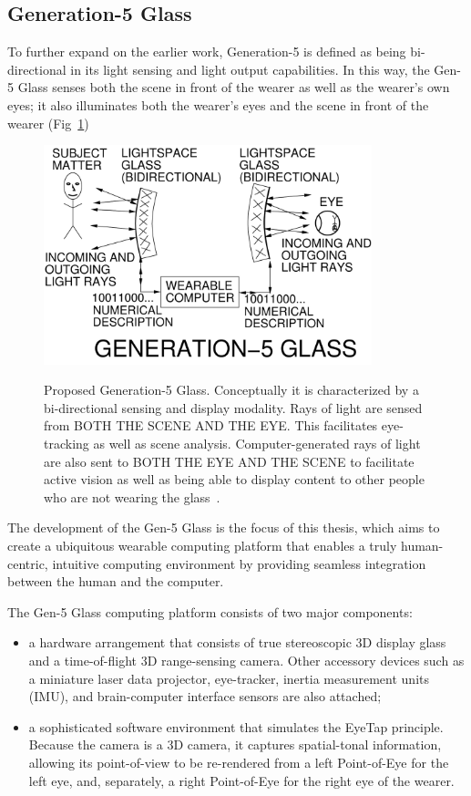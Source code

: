\subsection{Generation-5 Glass}
To further expand on the earlier work, Generation-5 is defined as being bi-directional in its light sensing 
and light output capabilities.  In this way, the Gen-5 Glass senses both the scene in front of the wearer 
as well as the wearer's
own eyes; it also illuminates both the wearer's eyes and the scene in front of the wearer 
(Fig~\ref{fig:genfive})

\begin{figure}
  \centering
  \includegraphics[width=3.75in]{ch6/figs/GL455.pdf}\\
  \caption{Proposed Generation-5 Glass.  Conceptually it is characterized
           by a bi-directional sensing and display modality.  Rays of light
           are sensed from BOTH THE SCENE AND THE EYE.  This facilitates
           eye-tracking as well as scene analysis. Computer-generated rays of light are also sent to 
BOTH THE
           EYE AND THE SCENE to facilitate active vision as well as
           being able to display content to other people who are not wearing
           the glass~\cite{mann2013freeglass}.}
  \label{fig:genfive}
\end{figure}

The development of the Gen-5 Glass is the focus of this thesis, which aims to create a ubiquitous 
wearable computing platform that enables a truly human-centric, intuitive computing environment by 
providing seamless integration between the human and the computer.

The Gen-5 Glass computing platform consists of two major components:
\begin{itemize}
  \item a hardware arrangement that consists of true stereoscopic 3D display glass and a time-of-flight 
3D range-sensing camera.  Other accessory devices such as a
        miniature laser data projector, eye-tracker, inertia measurement units (IMU), and brain-computer 
interface   sensors are also attached;
  \item a sophisticated software environment that simulates the EyeTap
        principle.  Because the camera is a 3D camera, it captures spatial-tonal
        information, allowing its point-of-view to be re-rendered from a
        left Point-of-Eye for the left eye, and, separately, a
        right Point-of-Eye for the right eye of the wearer.
\end{itemize}

